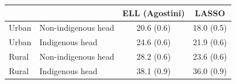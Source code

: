 \begin{tabular}{llcc}
\toprule
 & & ELL (Agostini) & LASSO \\
\midrule
Urban & Non-indigenous head & 20.6 (0.6) & 18.0 (0.5) \\
Urban & Indigenous head & 24.6 (0.6) & 21.9 (0.6) \\
Rural & Non-indigenous head & 28.2 (0.6) & 23.6 (0.6) \\
Rural & Indigenous head & 38.1 (0.9) & 36.0 (0.9) \\
\bottomrule
\end{tabular}

